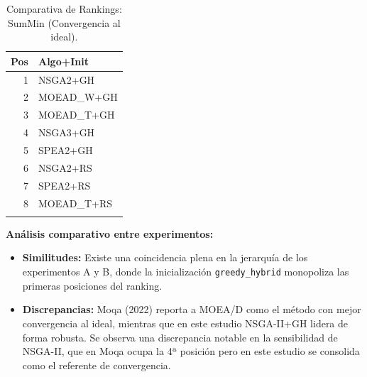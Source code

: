 \documentclass[a4paper,10pt]{article}
\begin{document}
\begin{table}[H]
\begin{minipage}[t]{0.32\textwidth}
        \begin{tabular}{rl}
            \toprule
            Pos & Algo+Init \\ \midrule
            1 & NSGA2+GH \\
            2 & MOEAD\_W+GH \\
            3 & MOEAD\_T+GH \\
            4 & NSGA3+GH \\
            5 & SPEA2+GH \\
            6 & NSGA2+RS \\
            7 & SPEA2+RS \\
            8 & MOEAD\_T+RS \\
            \\
            \bottomrule
        \end{tabular}
    \end{minipage}
    \caption{Comparativa de Rankings: SumMin (Convergencia al ideal).}
\end{table}

\textbf{Análisis comparativo entre experimentos:}
\begin{itemize}
    \item \textbf{Similitudes:} Existe una coincidencia plena en la jerarquía de los experimentos A y B, donde la inicialización \texttt{greedy\_hybrid} monopoliza las primeras posiciones del ranking.
    \item \textbf{Discrepancias:} Moqa (2022) reporta a MOEA/D como el método con mejor convergencia al ideal, mientras que en este estudio NSGA-II+GH lidera de forma robusta. Se observa una discrepancia notable en la sensibilidad de NSGA-II, que en Moqa ocupa la 4ª posición pero en este estudio se consolida como el referente de convergencia.
\end{itemize}
\end{document}
